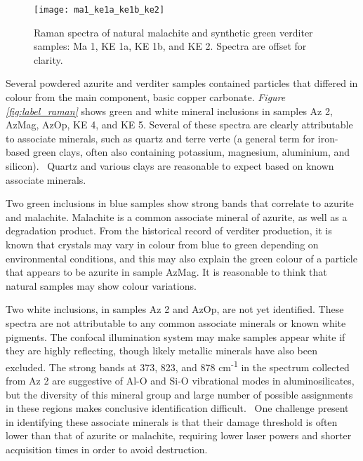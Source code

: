 \begin{figure}[H]
\centering
  \texttt{[image: ma1\_ke1a\_ke1b\_ke2]}
\caption[Raman spectra of green samples.]{Raman spectra of natural malachite and synthetic green verditer samples: Ma 1, KE 1a, KE 1b, and KE 2. Spectra are offset for clarity.}
\label{fig:green_comparison}
\end{figure}

Several powdered azurite and verditer samples contained particles that differed in colour from the main component, basic copper carbonate. \textit{Figure \ref{fig:label_raman}} shows green and white mineral inclusions in samples Az 2, AzMag, AzOp, KE 4, and KE 5. Several of these spectra are clearly attributable to associate minerals, such as quartz and terre verte (a general term for iron-based green clays, often also containing potassium, magnesium, aluminium, and silicon).~\autocite{ucl_database,cameo_mfa,irug_quartz} Quartz and various clays are reasonable to expect based on known associate minerals.

Two green inclusions in blue samples show strong bands that correlate to azurite and malachite. Malachite is a common associate mineral of azurite, as well as a degradation product. From the historical record of verditer production, it is known that crystals may vary in colour from blue to green depending on environmental conditions, and this may also explain the green colour of a particle that appears to be azurite in sample AzMag. It is reasonable to think that natural samples may show colour variations. 

Two white inclusions, in samples Az 2 and AzOp, are not yet identified. These spectra are not attributable to any common associate minerals or known white pigments. The confocal illumination system may make samples appear white if they are highly reflecting, though likely metallic minerals have also been excluded. The strong bands at 373, 823, and 878 cm\textsuperscript{-1} in the spectrum collected from Az 2 are suggestive of Al-O and Si-O vibrational modes in aluminosilicates, but the diversity of this mineral group and large number of possible assignments in these regions makes conclusive identification difficult.~\autocite{Culka} One challenge present in identifying these associate minerals is that their damage threshold is often lower than that of azurite or malachite, requiring lower laser powers and shorter acquisition times in order to avoid destruction.

